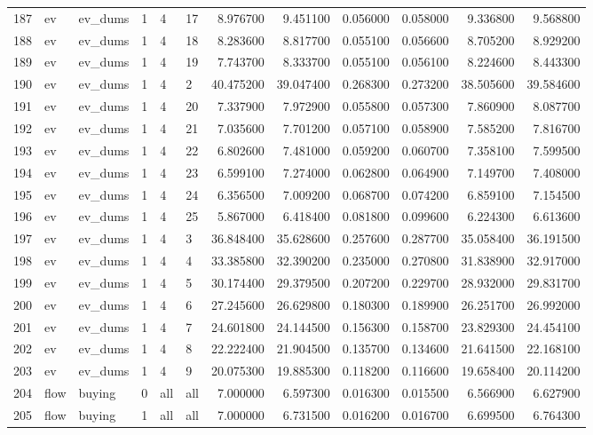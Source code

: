 \begin{tabular}{llllllrrrrrr}
187 & ev & ev_dums & 1 & 4 & 17 & 8.976700 & 9.451100 & 0.056000 & 0.058000 & 9.336800 & 9.568800 \\
188 & ev & ev_dums & 1 & 4 & 18 & 8.283600 & 8.817700 & 0.055100 & 0.056600 & 8.705200 & 8.929200 \\
189 & ev & ev_dums & 1 & 4 & 19 & 7.743700 & 8.333700 & 0.055100 & 0.056100 & 8.224600 & 8.443300 \\
190 & ev & ev_dums & 1 & 4 & 2 & 40.475200 & 39.047400 & 0.268300 & 0.273200 & 38.505600 & 39.584600 \\
191 & ev & ev_dums & 1 & 4 & 20 & 7.337900 & 7.972900 & 0.055800 & 0.057300 & 7.860900 & 8.087700 \\
192 & ev & ev_dums & 1 & 4 & 21 & 7.035600 & 7.701200 & 0.057100 & 0.058900 & 7.585200 & 7.816700 \\
193 & ev & ev_dums & 1 & 4 & 22 & 6.802600 & 7.481000 & 0.059200 & 0.060700 & 7.358100 & 7.599500 \\
194 & ev & ev_dums & 1 & 4 & 23 & 6.599100 & 7.274000 & 0.062800 & 0.064900 & 7.149700 & 7.408000 \\
195 & ev & ev_dums & 1 & 4 & 24 & 6.356500 & 7.009200 & 0.068700 & 0.074200 & 6.859100 & 7.154500 \\
196 & ev & ev_dums & 1 & 4 & 25 & 5.867000 & 6.418400 & 0.081800 & 0.099600 & 6.224300 & 6.613600 \\
197 & ev & ev_dums & 1 & 4 & 3 & 36.848400 & 35.628600 & 0.257600 & 0.287700 & 35.058400 & 36.191500 \\
198 & ev & ev_dums & 1 & 4 & 4 & 33.385800 & 32.390200 & 0.235000 & 0.270800 & 31.838900 & 32.917000 \\
199 & ev & ev_dums & 1 & 4 & 5 & 30.174400 & 29.379500 & 0.207200 & 0.229700 & 28.932000 & 29.831700 \\
200 & ev & ev_dums & 1 & 4 & 6 & 27.245600 & 26.629800 & 0.180300 & 0.189900 & 26.251700 & 26.992000 \\
201 & ev & ev_dums & 1 & 4 & 7 & 24.601800 & 24.144500 & 0.156300 & 0.158700 & 23.829300 & 24.454100 \\
202 & ev & ev_dums & 1 & 4 & 8 & 22.222400 & 21.904500 & 0.135700 & 0.134600 & 21.641500 & 22.168100 \\
203 & ev & ev_dums & 1 & 4 & 9 & 20.075300 & 19.885300 & 0.118200 & 0.116600 & 19.658400 & 20.114200 \\
204 & flow & buying & 0 & all & all & 7.000000 & 6.597300 & 0.016300 & 0.015500 & 6.566900 & 6.627900 \\
205 & flow & buying & 1 & all & all & 7.000000 & 6.731500 & 0.016200 & 0.016700 & 6.699500 & 6.764300 \\

\end{tabular}
